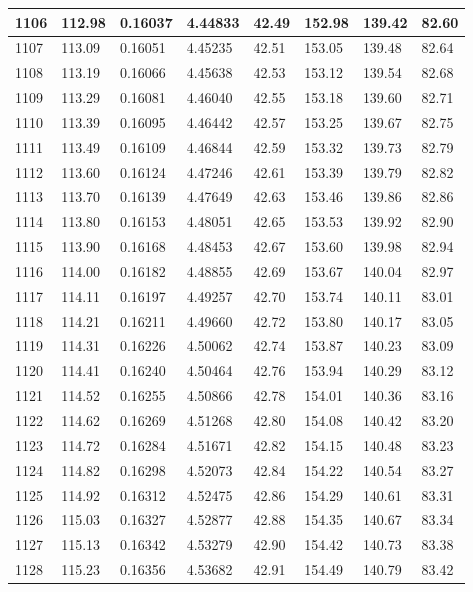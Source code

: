 \documentclass[12pt,a4paper,twoside]{article}
\begin{document}
\begin{center}
\begin{longtable}{l l l l | l l l l}
1106 & 112.98 & 0.16037 & 4.44833 & 42.49 & 152.98 & 139.42 & 82.60 \\ \hline
1107 & 113.09 & 0.16051 & 4.45235 & 42.51 & 153.05 & 139.48 & 82.64 \\ \hline
1108 & 113.19 & 0.16066 & 4.45638 & 42.53 & 153.12 & 139.54 & 82.68 \\ \hline
1109 & 113.29 & 0.16081 & 4.46040 & 42.55 & 153.18 & 139.60 & 82.71 \\ \hline
1110 & 113.39 & 0.16095 & 4.46442 & 42.57 & 153.25 & 139.67 & 82.75 \\ \hline
1111 & 113.49 & 0.16109 & 4.46844 & 42.59 & 153.32 & 139.73 & 82.79 \\ \hline
1112 & 113.60 & 0.16124 & 4.47246 & 42.61 & 153.39 & 139.79 & 82.82 \\ \hline
1113 & 113.70 & 0.16139 & 4.47649 & 42.63 & 153.46 & 139.86 & 82.86 \\ \hline
1114 & 113.80 & 0.16153 & 4.48051 & 42.65 & 153.53 & 139.92 & 82.90 \\ \hline
1115 & 113.90 & 0.16168 & 4.48453 & 42.67 & 153.60 & 139.98 & 82.94 \\ \hline
1116 & 114.00 & 0.16182 & 4.48855 & 42.69 & 153.67 & 140.04 & 82.97 \\ \hline
1117 & 114.11 & 0.16197 & 4.49257 & 42.70 & 153.74 & 140.11 & 83.01 \\ \hline
1118 & 114.21 & 0.16211 & 4.49660 & 42.72 & 153.80 & 140.17 & 83.05 \\ \hline
1119 & 114.31 & 0.16226 & 4.50062 & 42.74 & 153.87 & 140.23 & 83.09 \\ \hline
1120 & 114.41 & 0.16240 & 4.50464 & 42.76 & 153.94 & 140.29 & 83.12 \\ \hline
1121 & 114.52 & 0.16255 & 4.50866 & 42.78 & 154.01 & 140.36 & 83.16 \\ \hline
1122 & 114.62 & 0.16269 & 4.51268 & 42.80 & 154.08 & 140.42 & 83.20 \\ \hline
1123 & 114.72 & 0.16284 & 4.51671 & 42.82 & 154.15 & 140.48 & 83.23 \\ \hline
1124 & 114.82 & 0.16298 & 4.52073 & 42.84 & 154.22 & 140.54 & 83.27 \\ \hline
1125 & 114.92 & 0.16312 & 4.52475 & 42.86 & 154.29 & 140.61 & 83.31 \\ \hline
1126 & 115.03 & 0.16327 & 4.52877 & 42.88 & 154.35 & 140.67 & 83.34 \\ \hline
1127 & 115.13 & 0.16342 & 4.53279 & 42.90 & 154.42 & 140.73 & 83.38 \\ \hline
1128 & 115.23 & 0.16356 & 4.53682 & 42.91 & 154.49 & 140.79 & 83.42 \\ \hline

\end{longtable}
\end{center}
\end{document}
